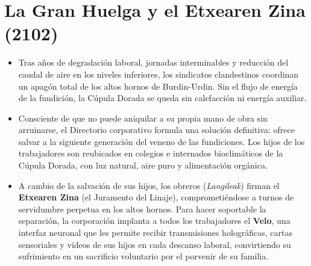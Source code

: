 \section{La Gran Huelga y el Etxearen Zina (2102)}


\begin{itemize}
  \item {} Tras años de degradación laboral, jornadas interminables y reducción del caudal de aire en los niveles inferiores, los sindicatos clandestinos coordinan un apagón total de los altos hornos de Burdin-Urdin. Sin el flujo de energía de la fundición, la Cúpula Dorada se queda sin calefacción ni energía auxiliar.
  
  \item {} Consciente de que no puede aniquilar a su propia mano de obra sin arruinarse, el Directorio corporativo formula una solución definitiva: ofrece salvar a la siguiente generación del veneno de las fundiciones. Los hijos de los trabajadores son reubicados en colegios e internados bioclimáticos de la Cúpula Dorada, con luz natural, aire puro y alimentación orgánica.
  
  \item {} A cambio de la salvación de sus hijos, los obreros (\emph{Langileak}) firman el \textbf{Etxearen Zina} (el Juramento del Linaje), comprometiéndose a turnos de servidumbre perpetua en los altos hornos. Para hacer soportable la separación, la corporación implanta a todos los trabajadores el \textbf{Velo}, una interfaz neuronal que les permite recibir transmisiones holográficas, cartas sensoriales y vídeos de sus hijos en cada descanso laboral, convirtiendo su sufrimiento en un sacrificio voluntario por el porvenir de su familia.
\end{itemize}
